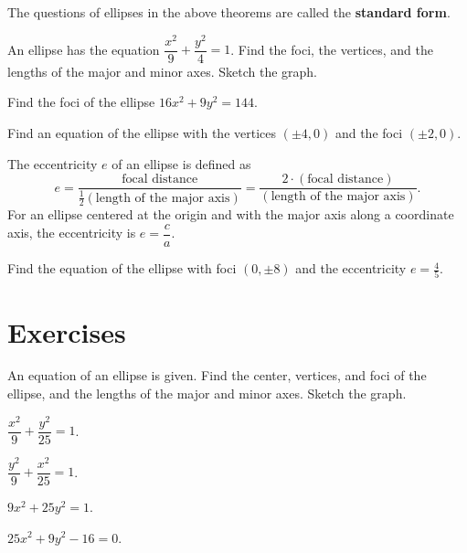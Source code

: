 The questions of ellipses in the above theorems are called the \textbf{standard form}.

\begin{example}
An ellipse has the equation $\dfrac{x^2}{9}+\dfrac{y^2}{4}=1$.
Find the foci, the vertices, and the lengths of the major and minor axes. Sketch the graph.
\end{example}

\newpage

\begin{example}
    Find the foci of the ellipse $16x^2+9y^2=144$.
\end{example}

\begin{example}
Find an equation of the ellipse with the vertices $(\pm 4, 0)$ and the foci $(\pm 2, 0)$.
\end{example}

\begin{definition}
The eccentricity $e$ of an ellipse is defined as
\[e=\dfrac{\text{focal distance}}{\frac12\left(\text{length of the major axis}\right)}=\dfrac{2\cdot(\text{focal distance})}{\left(\text{length of the major axis}\right)}.\]
For an ellipse centered at the origin and with the major axis along a coordinate axis, the eccentricity is $e=\dfrac ca$.
\end{definition}


\begin{example}
    Find the equation of the ellipse with foci $(0, \pm8)$ and the eccentricity $e=\frac45$.
\end{example}


\newpage
\section*{Exercises}


\begin{exercise}
    An equation of an ellipse is given. Find the center, vertices, and foci of the ellipse, and the lengths of the major and minor axes. Sketch the graph.\\
    \begin{enumerate*}
        \item $\dfrac{x^2}{9}+\dfrac{y^2}{25}=1$.
        \item $\dfrac{y^2}{9}+\dfrac{x^2}{25}=1$.
        \item $9x^2+25y^2=1$.
        \item $25x^2+9y^2-16=0$.
    \end{enumerate*}
\end{exercise}

